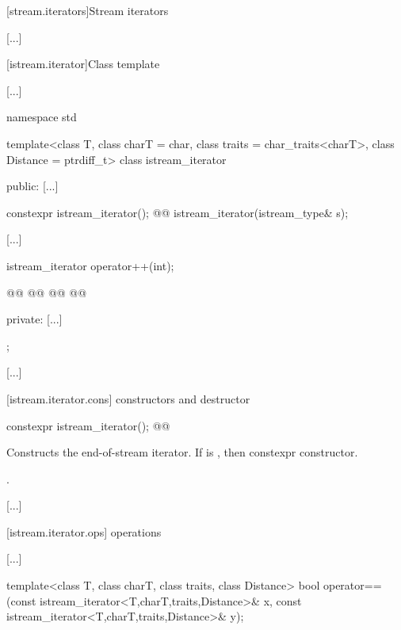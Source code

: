 [stream.iterators]{Stream iterators}

[...]

[istream.iterator]{Class template }

[...]

\begin{codeblock}
namespace std {
  template<class T, class charT = char, class traits = char_traits<charT>,
           class Distance = ptrdiff_t>
  class istream_iterator {
  public:
    [...]

    constexpr istream_iterator();
    @@
    istream_iterator(istream_type& s);

    [...]

    istream_iterator  operator++(int);

    @@
    @@
    @@
    @@

  private:
    [...]
  };

  [...]
}
\end{codeblock}

[istream.iterator.cons]{ constructors and destructor}

%
\begin{itemdecl}
constexpr istream_iterator();
@@
\end{itemdecl}

\begin{itemdescr}
\pnum
\effects
Constructs the end-of-stream iterator.
If  is ,
then  constexpr
constructor.

\pnum
\ensures {}.
\end{itemdescr}

[...]

[istream.iterator.ops]{ operations}

[...]

\setcounter{Paras}{7}
%
\begin{itemdecl}
template<class T, class charT, class traits, class Distance>
  bool operator==(const istream_iterator<T,charT,traits,Distance>& x,
                  const istream_iterator<T,charT,traits,Distance>& y);
\end{itemdecl}

